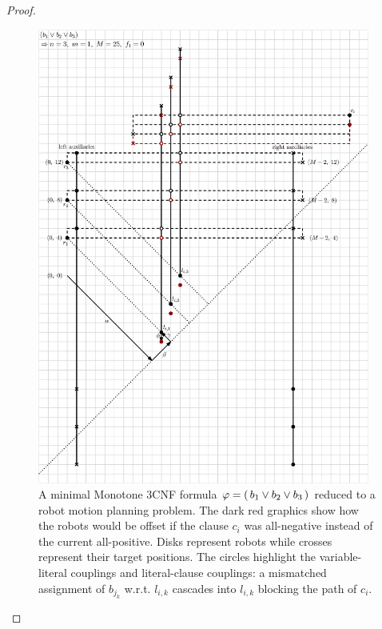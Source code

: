 \begin{proof}
\begin{figure}[h]
	\centering
	\includegraphics[height=15cm]{ipe/np_reduction.eps}
	\caption{
		A minimal Monotone 3CNF formula \(\varphi = (\, b_1 \lor b_2 \lor b_3 \,)\) reduced to a robot motion planning problem. 
		The dark red graphics show how the robots would be offset if the clause \(c_i\) was all-negative instead of the current all-positive. 
		Disks represent robots while crosses represent their target positions. 
		The circles highlight the variable-literal couplings and literal-clause couplings: a mismatched assignment of \(b_{j_k}\) w.r.t. \(l_{i,k}\) cascades into \(l_{i,k}\) blocking the path of \(c_i\).
	}\label{fig:full_reduction}
\end{figure}







\end{proof}
